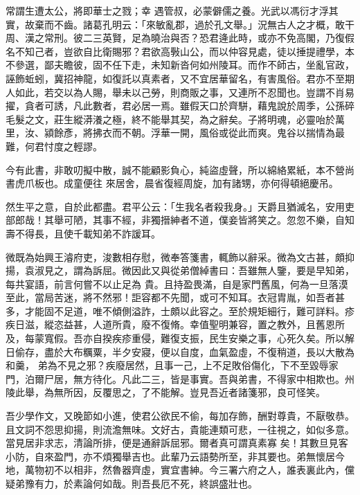 \begin{pinyinscope}
 常謂生遭太公，將即華士之戮；幸
 遇管叔，必蒙僻儒之養。光武以馮衍才浮其實，故棄而不齒。諸葛孔明云：「來敏亂郡，過於孔文舉。」況無古人之才概，敢干周、漢之常刑。彼二三英賢，足為曉治與否？恐君逄此時，或亦不免高閣，乃復假名不知己者，豈欲自比衛賜邪？君欲高斅山公，而以仲容見處，徒以捶提禮學，本不參選，鄙夫瞻彼，固不任下走，未知新沓何如州陵耳。而作不師古，坐亂官政，誣飾蚯蚓，冀招神龍，如復託以真素者，又不宜居華留名，有害風俗。君亦不至期
 人如此，若交以為人賜，舉未以己勞，則商販之事，又連所不忍聞也。豈謂不肖易擢，貪者可誘，凡此數者，君必居一焉。雖假天口於齊駢，藉鬼說於周季，公孫碎毛髮之文，莊生縱漭瀁之極，終不能舉其契，為之辭矣。子將明魂，必靈咍於萬里，汝、潁餘彥，將拂衣而不朝。浮華一開，風俗或從此而爽。鬼谷以揣情為最難，何君忖度之輕謬。



 今有此書，非敢叨擬中散，誠不能顧影負心，純盜虛聲，所以綿絡累紙，本不營尚書虎爪板也。成童便往
 來居舍，晨省復經周旋，加有諸甥，亦何得頓絕慶吊。



 然生平之意，自於此都盡。君平公云：「生我名者殺我身。」天爵且猶滅名，安用吏部郎哉！其舉可陋，其事不經，非獨搢紳者不道，僕妾皆將笑之。忽忽不樂，自知壽不得長，且使千載知弟不詐諼耳。



 微既為始興王濬府吏，浚數相存慰，微奉答箋書，輒飾以辭采。微為文古甚，頗抑揚，袁淑見之，謂為訴屈。微因此又與從弟僧綽書曰：吾雖無人鑒，要是早知弟，每共宴語，前言何嘗不以止足為
 貴。且持盈畏滿，自是家門舊風，何為一旦落漠至此，當局苦迷，將不然邪！詎容都不先聞，或可不知耳。衣冠胄胤，如吾者甚多，才能固不足道，唯不傾側溢詐，士頗以此容之。至於規矩細行，難可詳料。疹疾日滋，縱恣益甚，人道所貴，廢不復脩。幸值聖明兼容，置之教外，且舊恩所及，每蒙寬假。吾亦自揆疾疹重侵，難復支振，民生安樂之事，心死久矣。所以解日偷存，盡於大布糲粟，半夕安寢，便以自度，血氣盈虛，不復稍道，長以大散為和羹，
 弟為不見之邪？疾廢居然，且事一己，上不足敗俗傷化，下不至毀辱家門，泊爾尸居，無方待化。凡此二三，皆是事實。吾與弟書，不得家中相欺也。州陵此舉，為無所因，反覆思之，了不能解。豈見吾近者諸箋邪，良可怪笑。



 吾少學作文，又晚節如小進，使君公欲民不偷，每加存飾，酬對尊貴，不厭敬恭。且文詞不怨思抑揚，則流澹無味。文好古，貴能連類可悲，一往視之，如似多意。當見居非求志，清論所排，便是通辭訴屈邪。爾者真可謂真素寡
 矣！其數旦見客小防，自來盈門，亦不煩獨舉吉也。此輩乃云語勢所至，非其要也。弟無懷居今地，萬物初不以相非，然魯器齊虛，實宜書紳。今三署六府之人，誰表裏此內，儻疑弟豫有力，於素論何如哉。則吾長厄不死，終誤盛壯也。




\end{pinyinscope}
